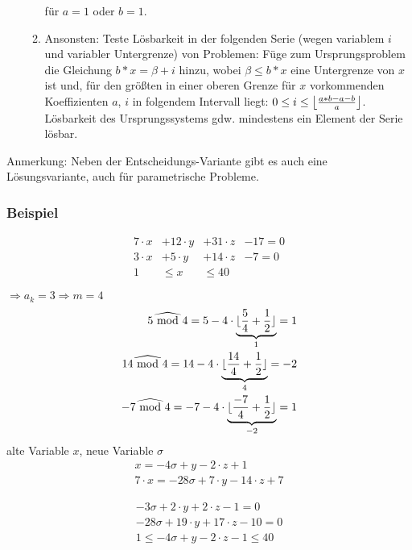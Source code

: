 \begin{enumerate}
\begin{enumerate}
    für $a=1$ oder $b=1$.
  \item Ansonsten: Teste Lösbarkeit in der folgenden Serie (wegen
    variablem $i$ und variabler Untergrenze) von Problemen: Füge zum
    Ursprungsproblem die Gleichung $b*x=\beta + i$ hinzu, wobei
    $\beta\leq b*x$ eine Untergrenze von $x$ ist und, für den
    größten in einer oberen Grenze für $x$ vorkommenden Koeffizienten
    $a$, $i$ in folgendem Intervall liegt: $0\leq i\leq
    \left\lfloor{a*b-a-b\over a}\right\rfloor$.  Lösbarkeit des
    Ursprungssystems gdw. mindestens ein Element der Serie lösbar.
  \end{enumerate}
\end{enumerate}



Anmerkung: Neben der Entscheidungs-Variante gibt es auch eine
Lösungsvariante, auch für parametrische Probleme.

\subsubsection{Beispiel}

\begin{align}
7 \cdot x &+ 12 \cdot y &+ 31 \cdot z  &-17 = 0\\
3 \cdot x &+ 5 \cdot y &+ 14 \cdot z &- 7 = 0\\
1 &\leq x &\leq 40
\end{align}

\( \Rightarrow a_k = 3 \Rightarrow m = 4\) \\
\[
\begin{split}
 5 \widehat{\textrm{\ mod\ }} 4 = 5-4 \cdot \underbrace{\lfloor \frac{5}{4} + \frac{1}{2} \rfloor}_{1} = 1 \\ 
  14 \widehat{\textrm{\ mod\ }} 4 = 14-4 \cdot \underbrace{\lfloor \frac{14}{4} + \frac{1}{2} \rfloor}_{4} = -2 \\
   -7 \widehat{\textrm{\ mod\ }} 4 = -7-4 \cdot \underbrace{ \lfloor \frac{-7}{4} + \frac{1}{2} \rfloor }_{-2}= 1
\end{split}
\]
alte Variable \(x\), neue Variable \( \sigma \) \\

\[
\begin{split}
 x = -4 \sigma + y - 2 \cdot z + 1 \\
  7\cdot x = -28 \sigma + 7 \cdot y - 14 \cdot z + 7 
\end{split}
\]

\begin{align}
 -3 \sigma +2 \cdot y + 2  \cdot z -1 = 0 \\
 -28 \sigma + 19 \cdot y + 17 \cdot z - 10 = 0 \\
 1 \leq - 4 \sigma + y - 2 \cdot z - 1 \leq 40
\end{align}

